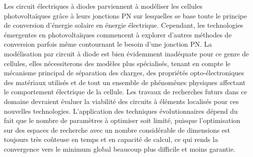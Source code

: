 Les circuit électriques à diodes parviennent à modéliser les cellules photovoltaïques grâce à leurs jonctions PN sur lesquelles se base toute le principe de conversion d'énergie solaire en énergie électrique. Cependant, les technologies émergentes en photovoltaïques commencent à explorer d'autres méthodes de conversion parfois même contournant le besoin d'une jonction PN. La modélisation par circuit à diode est bien évidemment inadéquate pour ce genre de cellules, elles nécessiterons des modèles plus spécialisés, tenant en compte le mécanisme principal de séparation des charges, des propriétés opto-électroniques des matériaux utilisés et de tout un ensemble de phénomènes physiques affectant le comportement électrique de la cellule. Les travaux de recherches futurs dans ce domaine devraient évaluer la viabilité des circuits à éléments localisés pour ces nouvelles technologies. L'application des techniques évolutionnaires dépend du fait que le nombre de paramètres à optimiser soit limité, puisque l'optimisation sur des espaces de recherche avec un nombre considérable de dimensions est toujours très coûteuse en temps et en capacité de calcul, ce qui rends la convergence vers le minimum global beaucoup plus difficile et moins garantie.


